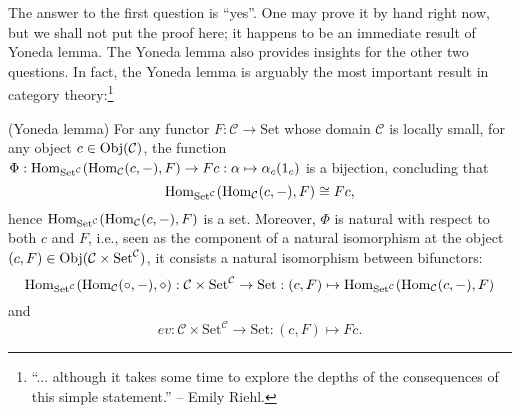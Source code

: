	The answer to the first question is ``yes''. One may prove it by hand right now, but we shall not put the proof here; it happens to be an immediate result of Yoneda lemma. The Yoneda lemma also provides insights for the other two questions. In fact, the Yoneda lemma is arguably the most important result in category theory:\footnote{``... although it takes some time to explore the depths of the consequences of this simple statement.'' -- Emily Riehl.}
	\begin{theorem}(Yoneda lemma)
		For any functor $F:\mathcal{C}\to \mathrm{Set}$ whose domain $\mathcal{C}$ is locally small, for any object $c\in\operatorname{Obj}(\mathcal{C})$, the function $\Phi:\operatorname{Hom}_{\mathrm{Set}^{\mathcal{C}}}(\operatorname{Hom}_\mathcal{C}(c,-),F)\to Fc:\alpha\mapsto \alpha_c(1_c)$ is a bijection, concluding that
		\[\operatorname{Hom}_{\mathrm{Set}^\mathcal{C}}(\operatorname{Hom}_\mathcal{C}(c,-),F)\cong Fc,\]
		hence $\operatorname{Hom}_{\mathrm{Set}^\mathcal{C}}(\operatorname{Hom}_\mathcal{C}(c,-),F)$ is a set. Moreover, $\Phi$ is natural with respect to both $c$ and $F$, i.e., seen as the component of a natural isomorphism at the object $(c,F)\in\operatorname{Obj}(\mathcal{C}\times\mathrm{Set}^\mathcal{C})$, it consists a natural isomorphism between bifunctors:
		\[\operatorname{Hom}_{\mathrm{Set}^\mathcal{C}}(\operatorname{Hom}_\mathcal{C}(\circ,-),\diamond):\mathcal{C}\times\mathrm{Set}^\mathcal{C}\to \mathrm{Set}:(c,F)\mapsto \operatorname{Hom}_{\mathrm{Set}^{\mathcal{C}}}(\operatorname{Hom}_\mathcal{C}(c,-),F)\]
		and
		\[ev:\mathcal{C}\times\mathrm{Set}^\mathcal{C}\to \mathrm{Set}:(c,F)\mapsto Fc.\]
	\end{theorem}
